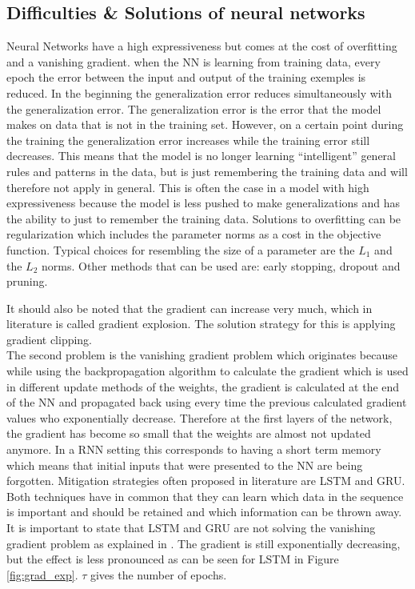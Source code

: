\subsection{Difficulties \& Solutions of neural networks}\label{s:Problems}
Neural Networks have a high expressiveness but comes at the cost of overfitting and a vanishing gradient.
when the NN is learning from training data, every epoch the error between the input and output of the training exemples is reduced. In the beginning the generalization error reduces simultaneously with the generalization error. The generalization error is the error that the model makes on data that is not in the training set. However, on a certain point during the training the generalization error increases while the training error still decreases. This means that the model is no longer learning ``intelligent'' general rules and patterns in the data, but is just remembering the training data and will therefore not apply in general. This is often the case in a model with high expressiveness because the model is less pushed to make generalizations and has the ability to just to remember the training data. Solutions to overfitting can be regularization which includes the parameter norms as a cost in the objective function. Typical choices for resembling the size of a parameter are the $ L_1 $ and the $ L_2 $ norms. Other methods that can be used are: early stopping, dropout and pruning.

It should also be noted that the gradient can increase very much, which in literature is called gradient explosion. The solution strategy for this is applying gradient clipping.\\

The second problem is the vanishing gradient problem which originates because while using the backpropagation algorithm to calculate the gradient which is used in different update methods of the weights, the gradient is calculated at the end of the NN and propagated back using every time the previous calculated gradient values who exponentially decrease. Therefore at the first layers of the network, the gradient has become so small that the weights are almost not updated anymore. In a RNN setting this corresponds to having a short term memory which means that initial inputs that were presented to the NN are being forgotten. Mitigation strategies often proposed in literature are LSTM and GRU. Both techniques have in common that they can learn which data in the sequence is important and should be retained and which information can be thrown away. It is important to state that LSTM and GRU are not solving the vanishing gradient problem as explained in \cite{Teuwen2019}. The gradient is still exponentially decreasing, but the effect is less pronounced as can be seen for LSTM in Figure \ref{fig:grad_exp}. $ \tau $ gives the number of epochs.\\ 

